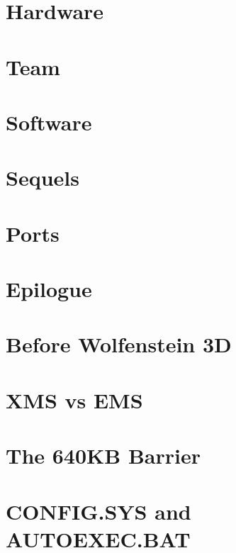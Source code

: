 \documentclass[8pt]{book}
\begin{document}
    \chapter{Hardware}
      
    \chapter{Team}
      
      
    \chapter{Software}
       
       
      
       
       
      
       
    
  
           


\chapter{Sequels}
        
        

    \chapter{Ports}        
        
        
    
       \chapter{Epilogue}
        

        \appendix
    \appendixpage

\chapter{Before Wolfenstein 3D}
        
    
    \chapter{XMS vs EMS} 
          
    \chapter{The 640KB Barrier}\label{chap:barrier640}
        
    \chapter{CONFIG.SYS and AUTOEXEC.BAT}
         
\end{document}
